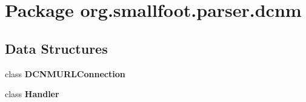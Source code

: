 \section{Package org.\+smallfoot.\+parser.\+dcnm}
\label{namespaceorg_1_1smallfoot_1_1parser_1_1dcnm}
\subsection*{Data Structures}
\begin{DoxyCompactItemize}
\item 
class {\bf D\+C\+N\+M\+U\+R\+L\+Connection}
\item 
class {\bf Handler}
\end{DoxyCompactItemize}
